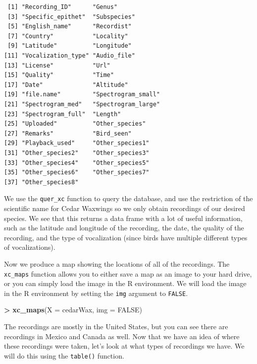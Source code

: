 \documentclass[
]{krantz}
\makeatletter
\newenvironment{Shaded}{\begin{snugshade}}{\end{snugshade}}
\newcommand{\DataTypeTok}[1]{\textcolor[rgb]{0.27,0.27,0.27}{#1}}
\newcommand{\KeywordTok}[1]{\textcolor[rgb]{0.27,0.27,0.27}{\textbf{#1}}}
\newcommand{\NormalTok}[1]{#1}
\newcommand{\OperatorTok}[1]{\textcolor[rgb]{0.43,0.43,0.43}{\textbf{#1}}}
\newcommand{\OtherTok}[1]{\textcolor[rgb]{0.37,0.37,0.37}{#1}}
\newcommand{\StringTok}[1]{\textcolor[rgb]{0.5,0.5,0.5}{#1}}
\newenvironment{kframe}{%
\medskip{}
\setlength{\fboxsep}{.8em}
 \def\at@end@of@kframe{}%
 \ifinner\ifhmode%
  \def\at@end@of@kframe{\end{minipage}}%
  \begin{minipage}{\columnwidth}%
 \fi\fi%
 \def\FrameCommand##1{\hskip\@totalleftmargin \hskip-\fboxsep
 \colorbox{shadecolor}{##1}\hskip-\fboxsep
     \hskip-\linewidth \hskip-\@totalleftmargin \hskip\columnwidth}%
 \MakeFramed {\advance\hsize-\width
   \@totalleftmargin\z@ \linewidth\hsize
   \@setminipage}}%
 {\par\unskip\endMakeFramed%
 \at@end@of@kframe}
\renewenvironment{Shaded}{\begin{kframe}}{\end{kframe}}
\makeatother
\begin{document}
\begin{verbatim}
 [1] "Recording_ID"      "Genus"            
 [3] "Specific_epithet"  "Subspecies"       
 [5] "English_name"      "Recordist"        
 [7] "Country"           "Locality"         
 [9] "Latitude"          "Longitude"        
[11] "Vocalization_type" "Audio_file"       
[13] "License"           "Url"              
[15] "Quality"           "Time"             
[17] "Date"              "Altitude"         
[19] "file.name"         "Spectrogram_small"
[21] "Spectrogram_med"   "Spectrogram_large"
[23] "Spectrogram_full"  "Length"           
[25] "Uploaded"          "Other_species"    
[27] "Remarks"           "Bird_seen"        
[29] "Playback_used"     "Other_species1"   
[31] "Other_species2"    "Other_species3"   
[33] "Other_species4"    "Other_species5"   
[35] "Other_species6"    "Other_species7"   
[37] "Other_species8"   
\end{verbatim}

We use the \texttt{quer\_xc} function to query the database, and use the restriction of the scientific name for Cedar Waxwings so we only obtain recordings of our desired species. We see that this returns a data frame with a lot of useful information, such as the latitude and longitude of the recording, the date, the quality of the recording, and the type of vocalization (since birds have multiple different types of vocalizations).

Now we produce a map showing the locations of all of the recordings. The \texttt{xc\_maps} function allows you to either save a map as an image to your hard drive, or you can simply load the image in the R environment. We will load the image in the R environment by setting the \texttt{img} argument to \texttt{FALSE}.

\begin{Shaded}
\begin{Highlighting}[]
\OperatorTok{\textgreater{}}\StringTok{ }\KeywordTok{xc\_maps}\NormalTok{(}\DataTypeTok{X =}\NormalTok{ cedarWax, }\DataTypeTok{img =} \OtherTok{FALSE}\NormalTok{)}
\end{Highlighting}
\end{Shaded}

The recordings are mostly in the United States, but you can see there are recordings in Mexico and Canada as well. Now that we have an idea of where these recordings were taken, let's look at what types of recordings we have. We will do this using the \texttt{table()} function.

\begin{Shaded}
\end{Shaded}
\end{document}
